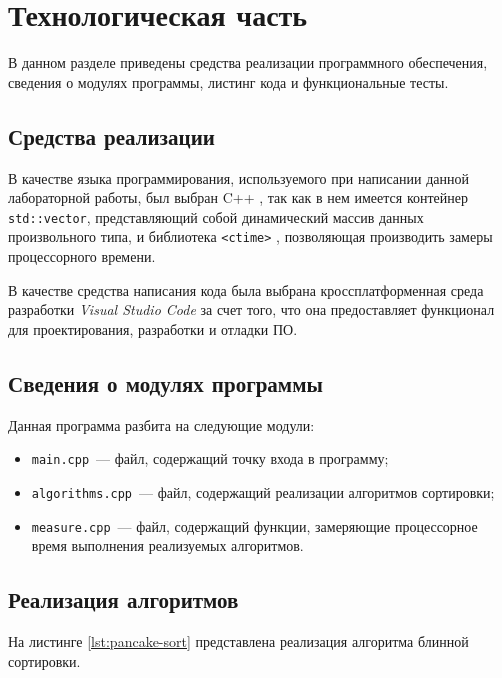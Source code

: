 \chapter{Технологическая часть}

В данном разделе приведены средства реализации программного обеспечения, сведения о модулях программы, листинг кода и функциональные тесты.

\section{Средства реализации}

В качестве языка программирования, используемого при написании данной лабораторной работы, был выбран C++ \cite{cpp-lang}, так как в нем имеется контейнер \texttt{std::vector}, представляющий собой динамический массив данных произвольного типа, и библиотека \texttt{<ctime>} \cite{ctime}, позволяющая производить замеры процессорного времени.

В качестве средства написания кода была выбрана кроссплатформенная среда разработки \textit{Visual Studio Code} за счет того, что она предоставляет функционал для проектирования, разработки и отладки ПО.

\section{Сведения о модулях программы}

Данная программа разбита на следующие модули:

\begin{itemize}
    \item \texttt{main.cpp}~--- файл, содержащий точку входа в программу;
    \item \texttt{algorithms.cpp}~--- файл, содержащий реализации алгоритмов сортировки;
    \item \texttt{measure.cpp}~--- файл, содержащий функции, замеряющие процессорное время выполнения реализуемых алгоритмов.
\end{itemize}

\clearpage
\section{Реализация алгоритмов}

На листинге \ref{lst:pancake-sort} представлена реализация алгоритма блинной сортировки.

